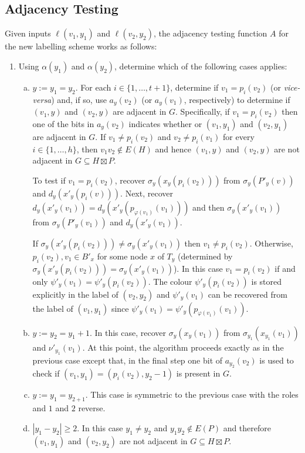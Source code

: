 \documentclass{patmorin}
\begin{document}
\subsection{Adjacency Testing}

Given inputs $\ell(v_1,y_1)$ and $\ell(v_2,y_2)$, the adjacency testing function $A$ for the new labelling scheme works as follows:
\begin{enumerate}
    \item Using $\alpha(y_1)$ and $\alpha(y_2)$, determine which of the following cases applies:
    \begin{enumerate}[(a)]
        \item $y:=y_1=y_2$.  For each $i\in\{1,\ldots,t+1\}$, determine if $v_1=p_i(v_2)$ (or \textit{vice-versa}) and, if so, use $a_y(v_2)$ (or $a_y(v_1)$, respectively) to determine if $(v_1,y)$ and $(v_2,y)$ are adjacent in $G$. Specifically, if $v_1=p_i(v_2)$ then one of the bits in $a_y(v_2)$ indicates whether or $(v_1,y_1)$ and $(v_2,y_1)$ are adjacent in $G$. If $v_1\neq p_i(v_2)$ and $v_2\neq p_i(v_1)$ for every $i\in\{1,\ldots,h\}$, then $v_1v_2\not\in E(H)$ and hence $(v_1,y)$ and $(v_2,y)$ are not adjacent in $G\subseteq H\boxtimes P$.

        To test if $v_1=p_i(v_2)$, recover $\sigma_y(x_y(p_i(v_2)))$ from $\sigma_y(P'_y(v))$ and $d_y(x'_y(p_i(v)))$.  Next, recover $d_y(x'_y(v_1))=d_y(x'_y(p_{\varphi(v_1)}(v_1)))$ and then  $\sigma_y(x'_y(v_1))$ from $\sigma_y(P'_y(v_1))$ and $d_y(x'_y(v_1))$.

        If $\sigma_y(x'_y(p_i(v_2))) \neq \sigma_y(x'_y(v_1))$ then $v_1\neq p_i(v_2)$.  Otherwise, $p_i(v_2), v_1 \in B'_x$ for some node $x$ of $T_y$ (determined by $\sigma_y(x'_y(p_i(v_2))) = \sigma_y(x'_y(v_1))$).  In this case $v_1=p_i(v_2)$ if and only $\psi'_y(v_1)=\psi'_y(p_i(v_2))$.  The colour $\psi'_y(p_i(v_2))$ is stored explicitly in the label of $(v_2,y_2)$ and $\psi'_y(v_1)$ can be recovered from the label of $(v_1,y_1)$ since $\psi'_y(v_1)=\psi'_y(p_{\varphi(v_1)}(v_1))$.

        \item $y:=y_2=y_1+1$.  In this case, recover $\sigma_y(x_y(v_1))$ from $\sigma_{y_1}(x_{y_1}(v_1))$ and $\nu'_{y_1}(v_1)$.  At this point, the algorithm proceeds exactly as in the previous case except that, in the final step one bit of $a_{y_2}(v_2)$ is used to check if $(v_1,y_1)=(p_i(v_2),y_2-1)$ is present in $G$.

        \item $y:=y_1=y_{2+1}$. This case is symmetric to the previous case with the roles and $1$ and $2$ reverse.

        \item $|y_1-y_2|\ge 2$.  In this case $y_1\neq y_2$ and $y_1y_2\not\in E(P)$ and therefore $(v_1,y_1)$ and $(v_2,y_2)$ are not adjacent in $G\subseteq H\boxtimes P$.
    \end{enumerate}
\end{enumerate}
\end{document}
